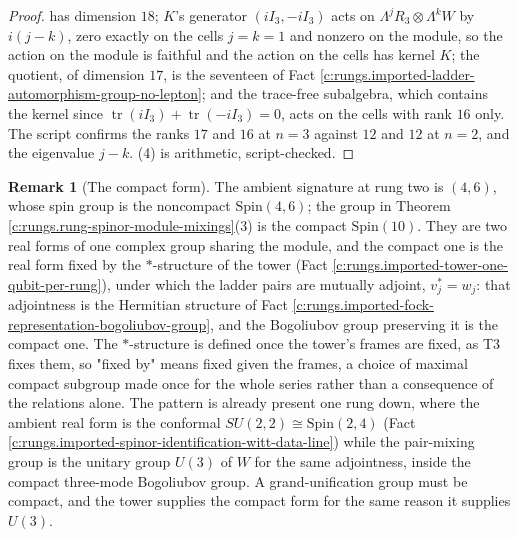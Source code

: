 \documentclass[11pt]{article}
\theoremstyle{definition}
\newtheorem{remark}[theorem]{Remark}
\theoremstyle{plain}
\providecommand{\tr}{}\renewcommand{\tr}{\operatorname{tr}}
\begin{document}
\begin{proof}
has dimension $18$; $K$'s generator $(iI_{3}, -iI_{3})$ acts on $\Lambda^{j}R_{3} \otimes \Lambda^{k}W$ by $i(j - k)$, zero exactly on the cells $j = k = 1$ and nonzero on the module, so the action on the module is faithful and the action on the cells has kernel $K$; the quotient, of dimension $17$, is the seventeen of Fact \ref{c:rungs.imported-ladder-automorphism-group-no-lepton}; and the trace-free subalgebra, which contains the kernel since $\tr(iI_{3}) + \tr(-iI_{3}) = 0$, acts on the cells with rank $16$ only. The script confirms the ranks $17$ and $16$ at $n = 3$ against $12$ and $12$ at $n = 2$, and the eigenvalue $j - k$. (4) is arithmetic, script-checked.

\end{proof}

\begin{remark}[The compact form]\label{c:note.rungs.compact-form}
The ambient signature at rung two is $(4,6)$, whose spin group is the noncompact $\mathrm{Spin}(4,6)$; the group in Theorem \ref{c:rungs.rung-spinor-module-mixings}(3) is the compact $\mathrm{Spin}(10)$. They are two real forms of one complex group sharing the module, and the compact one is the real form fixed by the $*$-structure of the tower (Fact \ref{c:rungs.imported-tower-one-qubit-per-rung}), under which the ladder pairs are mutually adjoint, $v_{j}^{*} = w_{j}$: that adjointness is the Hermitian structure of Fact \ref{c:rungs.imported-fock-representation-bogoliubov-group}, and the Bogoliubov group preserving it is the compact one. The $*$-structure is defined once the tower's frames are fixed, as T3 fixes them, so "fixed by" means fixed given the frames, a choice of maximal compact subgroup made once for the whole series rather than a consequence of the relations alone. The pattern is already present one rung down, where the ambient real form is the conformal $SU(2,2) \cong \mathrm{Spin}(2,4)$ (Fact \ref{c:rungs.imported-spinor-identification-witt-data-line}) while the pair-mixing group is the unitary group $U(3)$ of $W$ for the same adjointness, inside the compact three-mode Bogoliubov group. A grand-unification group must be compact, and the tower supplies the compact form for the same reason it supplies $U(3)$.
\end{remark}
\end{document}
